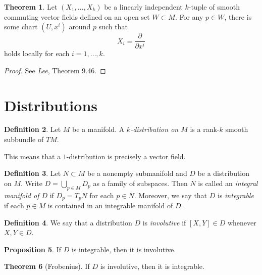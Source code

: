\documentclass[10pt,letterpaper,cm]{nupset}
\theoremstyle{definition}
\newtheorem{definition}{Definition}[subsection]
\theoremstyle{theorem}
\newtheorem{theorem}[definition]{Theorem}
\newtheorem{prop}[definition]{Proposition}
\theoremstyle{remark}
\newcommand{\1}{\mathbf{1}}
\newcommand{\0}{\vec 0}
\begin{document}
\begin{theorem}
Let $(X_1, \ldots, X_k)$ be a linearly independent $k$-tuple of smooth commuting vector fields defined on an open set $W\subset M$. For any $p\in W$, there is some chart $(U, x^i)$ around $p$ such that $$X_i = \frac{\partial}{\partial{x^i}}$$ holds locally for each $i=1, \ldots, k$.
\end{theorem}
\begin{proof}
See \textit{Lee}, Theorem 9.46.
\end{proof}

\section{Distributions}

\begin{definition}
Let $M$ be a manifold. A \textit{$k$-distribution on $M$} is a rank-$k$ smooth subbundle of $TM$.
\end{definition}

This means that a $1$-distribution is precisely a vector field. 


\begin{definition}
Let $N\subset M$ be a nonempty submanifold and $D$ be a distribution on $M$. Write $D = \bigcup_{p\in M}D_p$ as a family of subspaces. Then $N$ is called an \textit{integral manifold of $D$} if $D_p = T_pN$ for each $p\in N$. Moreover, we say that $D$ is \textit{integrable} if each $p\in M$ is contained in an integrable manifold of $D$.  
\end{definition}

\begin{definition}
We say that a distribution $D$ is \textit{involutive} if $[X,Y]\in D$ whenever $X,Y \in D$. 
\end{definition}

\begin{prop}
If $D$ is integrable, then it is involutive.
\end{prop}

\begin{theorem}[Frobenius]
If $D$ is involutive, then it is integrable. 
\end{theorem}
\end{document}
